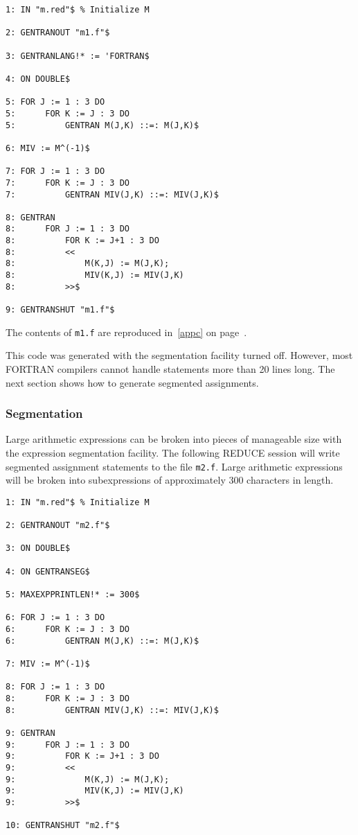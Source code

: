 \begin{verbatim}
1: IN "m.red"$ % Initialize M

2: GENTRANOUT "m1.f"$

3: GENTRANLANG!* := 'FORTRAN$

4: ON DOUBLE$

5: FOR J := 1 : 3 DO
5:      FOR K := J : 3 DO
5:          GENTRAN M(J,K) ::=: M(J,K)$

6: MIV := M^(-1)$

7: FOR J := 1 : 3 DO
7:      FOR K := J : 3 DO
7:          GENTRAN MIV(J,K) ::=: MIV(J,K)$

8: GENTRAN
8:      FOR J := 1 : 3 DO
8:          FOR K := J+1 : 3 DO
8:          <<
8:              M(K,J) := M(J,K);
8:              MIV(K,J) := MIV(J,K)
8:          >>$

9: GENTRANSHUT "m1.f"$
\end{verbatim}
The contents of {\tt m1.f} are reproduced in~\ref{appc} on page~\pageref{appc}.

This code was generated with the segmentation facility turned off.  However,
most FORTRAN compilers cannot handle statements more than 20 lines
long.  The next section shows how to generate segmented assignments.

\subsubsection{Segmentation}
\label{seg:example}
Large arithmetic expressions can be broken into pieces of manageable
size with the expression segmentation facility.  The following REDUCE
session will write segmented assignment statements to the
file {\tt m2.f}.  Large arithmetic expressions will be broken into
subexpressions of approximately 300 characters in length.

\begin{verbatim}
1: IN "m.red"$ % Initialize M

2: GENTRANOUT "m2.f"$

3: ON DOUBLE$

4: ON GENTRANSEG$

5: MAXEXPPRINTLEN!* := 300$

6: FOR J := 1 : 3 DO
6:      FOR K := J : 3 DO
6:          GENTRAN M(J,K) ::=: M(J,K)$

7: MIV := M^(-1)$

8: FOR J := 1 : 3 DO
8:      FOR K := J : 3 DO
8:          GENTRAN MIV(J,K) ::=: MIV(J,K)$

9: GENTRAN
9:      FOR J := 1 : 3 DO
9:          FOR K := J+1 : 3 DO
9:          <<
9:              M(K,J) := M(J,K);
9:              MIV(K,J) := MIV(J,K)
9:          >>$

10: GENTRANSHUT "m2.f"$
\end{verbatim}


